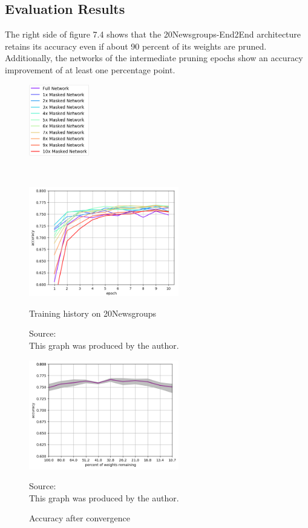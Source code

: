 \subsection*{Evaluation Results}
The right side of figure 7.4 shows that the 20Newsgroups-End2End architecture retains its accuracy even if about 90 percent of its weights are pruned. Additionally, the networks of the intermediate pruning epochs show an accuracy improvement of at least one percentage point.
\begin{figure}
	\begin{minipage}{0.5\textwidth}
		\centering
		\includegraphics[width=100px]{gfx/7-Evaluation/20Newsgroups_legend.png}
	\end{minipage}
	\begin{minipage}{0.5\textwidth}
		\centering
	\end{minipage}
	\\
	\begin{minipage}{0.5\textwidth}
		\centering
		\includegraphics[height=180px]{gfx/Experiments/Transfer-20Newsgroups-CNN/accuracy/10_iterations.png}
		\caption{Training history on 20Newsgroups}
		\vspace{7pt}
		\footnotesize{
			Source:\\
			This graph was produced by the author.
		}
		\label{fig:20Newsgorups-Training}
	\end{minipage}\hfill
	\begin{minipage}{0.5\textwidth}
		\centering
		\includegraphics[height=180px]{gfx/Experiments/Transfer-20Newsgroups-CNN/accuracy/converged.png}
		\caption{Accuracy after convergence}
		\vspace{7pt}
		\footnotesize{
			Source:\\
			This graph was produced by the author.
		}
		\label{fig:20Newsgroups-Converged}
	\end{minipage}
\end{figure}

